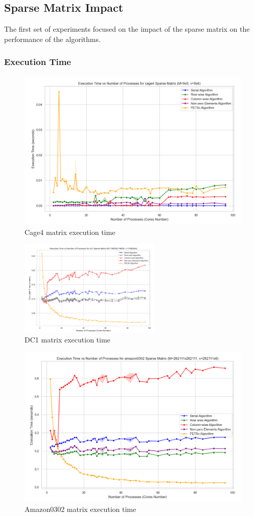 \documentclass[12pt,oneside]{book} %
\begin{document}
\subsection{Sparse Matrix Impact}
The first set of experiments focused on the impact of the sparse matrix on the
performance of the algorithms.
\subsubsection{Execution Time}
\begin{figure}[H]
    \centering
    \includegraphics[width=0.5\linewidth]{../results/matrix_dim/cage4_k6_execution_time.png}
    \caption{Cage4 matrix execution time}\label{fig:cage4-k6-execution-time}
\end{figure}

\begin{figure}[H]
    \centering
    \includegraphics[width=0.6\textwidth]{../results/matrix_dim/dc1_k6_execution_time.png}
    \caption{DC1 matrix execution time}\label{fig:dc1-k6-execution-time}
\end{figure}

\begin{figure}[H]
    \centering
    \includegraphics[width=0.6\linewidth]{../results/matrix_dim/amazon0302_k6_execution_time.png}
    \caption{Amazon0302 matrix execution time}\label{fig:amazon0302-k6-execution-time}
\end{figure}
\end{document}
